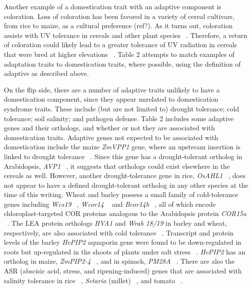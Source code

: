 \documentclass[12pt]{article}
\begin{document}
Another example of a domestication trait with an adaptive component is coloration. Loss of coloration has been favored in a variety of cereal cultivars, from rice to maize, as a cultural preference (ref?). As it turns out, coloration assists with UV tolerance in cereals and other plant species ~\cite{pmid8058838, Gould2004}. Therefore, a return of coloration could likely lead to a greater tolerance of UV radiation in cereals that were bred at higher elevations ~\cite{Pyhjrvi2013}.  Table 2 attempts to match examples of adaptation traits to domestication traits, where possible, using the definition of adaptive as described above. 

On the flip side, there are a number of adaptive traits unlikely to have a domestication component, since they appear unrelated to domestication syndrome traits. These include (but are not limited to) drought tolerance; cold tolerance; soil salinity; and pathogen defense.  Table 2 includes some adaptive genes and their orthologs, and whether or not they are associated with domestication traits.  Adaptive genes not expected to be associated with domestication include the maize \textit{ZmVPP1} gene, where an upstream insertion is linked to drought tolerance ~\cite{Wang2016}.  Since this gene has a drought-tolerant ortholog in Arabidopsis, \textit{AVP1} ~\cite{Gaxiola2001}, it suggests that orthologs could exist elsewhere in the cereals as well. However, another drought-tolerance gene in rice, \textit{OsAHL1} ~\cite{Zhou2016}, does not appear to have a defined drought-tolerant ortholog in any other species at the time of this writing. Wheat and barley possess a small family of cold-tolerance genes including \textit{Wcs19} ~\cite{pmid8219063}, \textit{Wcor14} ~\cite{pmid10846621} and \textit{Bcor14b} ~\cite{pmid9952464}, all of which encode chloroplast-targeted COR proteins analogous to the Arabidopsis protein \textit{COR15a}  ~\cite{pmid9826741, Takumi2003}. The LEA protein orthologs \textit{HVA1} and \textit{Wrab 18/19} in barley and wheat, respectively, are also associated with cold tolerance ~\cite{Hong1988, pmid16755132}. Transcript and protein levels of the barley \textit{HvPIP2} aquaporin gene were found to be down-regulated in roots but up-regulated in the shoots of plants under salt stress ~\cite{Katsuhara2002}.  \textit{HvPIP2} has an ortholog in maize, \textit{ZmPIP2-4} ~\cite{Zhu2005}, and in spinach, \textit{PM28A} ~\cite{Fotiadis2000}. There are also the ASR (abscisic acid, stress, and ripening-induced) genes that are associated with salinity tolerance in rice ~\cite{Joo2013}, \textit{Setaria} (millet) ~\cite{Li2017}, and tomato ~\cite{Konrad2008}. 
\end{document}
